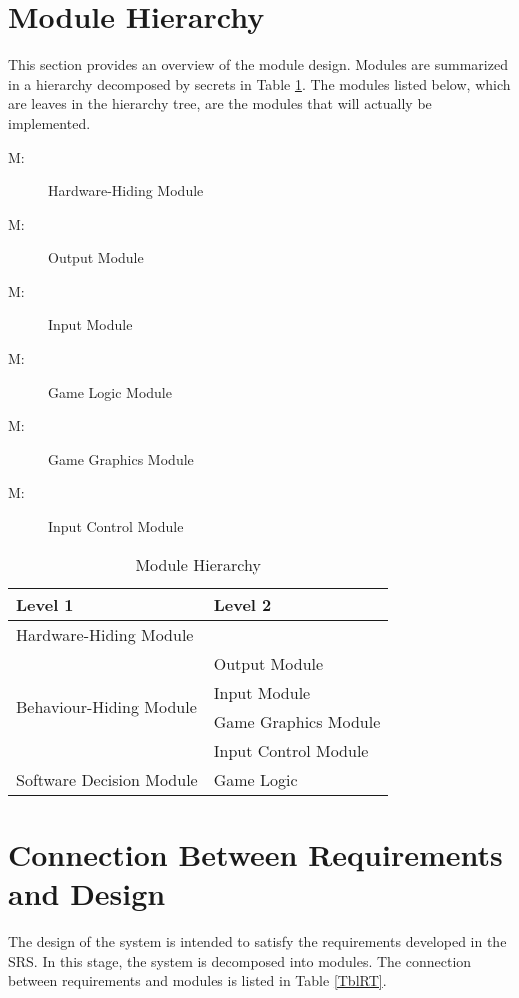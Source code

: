 \documentclass[12pt, titlepage]{article}
\newcounter{mnum}
\newcommand{\mthemnum}{M\themnum}
\begin{document}
\section{Module Hierarchy} \label{SecMH}
This section provides an overview of the module design. Modules are summarized
in a hierarchy decomposed by secrets in Table \ref{TblMH}. The modules listed
below, which are leaves in the hierarchy tree, are the modules that will
actually be implemented.
\begin{description}
\item [ \mthemnum \label{mHH}:] Hardware-Hiding Module
\item [ \mthemnum \label{mOM}:] Output Module
\item [ \mthemnum \label{mIM}:] Input Module
\item [ \mthemnum \label{mGL}:] Game Logic Module
\item [ \mthemnum \label{mGG}:] Game Graphics Module
\item [ \mthemnum \label{mIC}:] Input Control Module
\end{description}
\begin{table}[h!]
\centering
\begin{tabular}{p{} p{}}
\toprule
\textbf{Level 1} & \textbf{Level 2}\\
\midrule
{Hardware-Hiding Module} & ~ \\
\midrule
\multirow{4}{0.3\textwidth}{Behaviour-Hiding Module} & Output Module\\
& Input Module\\
& Game Graphics Module\\
& Input Control Module\\
\midrule
\multirow{1}{0.3\textwidth}{Software Decision Module} &  Game Logic\\

\bottomrule
\end{tabular}
\caption{Module Hierarchy}
\label{TblMH}
\end{table}


\section{Connection Between Requirements and Design} \label{SecConnection}
The design of the system is intended to satisfy the requirements developed in
the SRS. In this stage, the system is decomposed into modules. The connection
between requirements and modules is listed in Table \ref{TblRT}.
\end{document}
